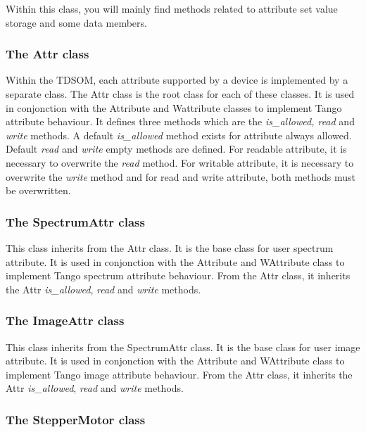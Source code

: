 Within this class, you will mainly find methods related to attribute
set value storage and some data members.


\subsubsection{The Attr class}

Within the TDSOM, each attribute supported by a device
is implemented by a separate class. The Attr class is
the root class for each of these classes. It is used in conjonction
with the Attribute and Wattribute classes to implement Tango attribute
behaviour. It defines three methods which are the \emph{is\_allowed,
read} and \emph{write} methods. A default \emph{is\_allowed} method
exists for attribute always allowed. Default \emph{read} and \emph{write}
empty methods are defined. For readable attribute, it is necessary
to overwrite the \emph{read} method. For writable attribute, it is
necessary to overwrite the \emph{write} method and for read and write
attribute, both methods must be overwritten.


\subsubsection{The SpectrumAttr class}

This class inherits from the Attr class. It is the base class for
user spectrum attribute. It is used in conjonction with the Attribute
and WAttribute class to implement Tango spectrum attribute behaviour.
From the Attr class, it inherits the Attr \emph{is\_allowed}, \emph{read}
and \emph{write} methods.


\subsubsection{The ImageAttr class}

This class inherits from the SpectrumAttr class. It is the base class
for user image attribute. It is used in conjonction with the Attribute
and WAttribute class to implement Tango image attribute behaviour.
From the Attr class, it inherits the Attr \emph{is\_allowed}, \emph{read}
and \emph{write} methods.


\subsubsection{The StepperMotor class}


